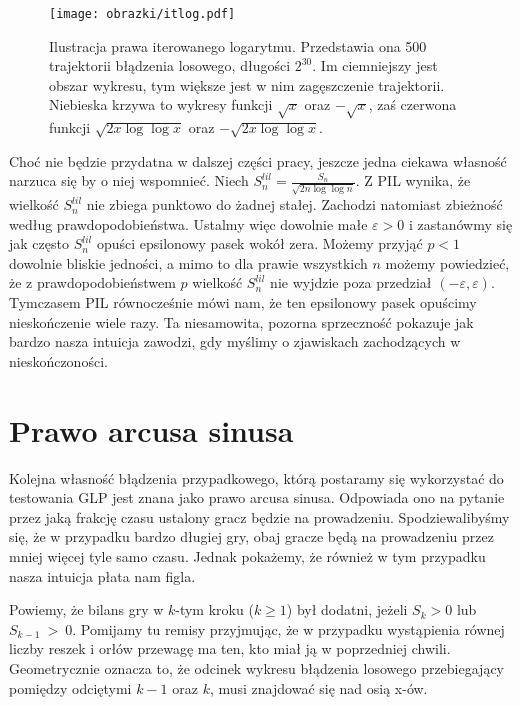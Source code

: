 \documentclass[a4paper,11pt,twoside]{book}
\newcommand{\Slil}[1]{S^{lil}_#1}
\theoremstyle{definition}
\begin{document}
\begin{figure}[!ht]
 \centering
 \texttt{[image: obrazki/itlog.pdf]}
 \caption{Ilustracja prawa iterowanego logarytmu. Przedstawia ona 500 trajektorii błądzenia losowego, długości $2^{30}$. Im ciemniejszy jest obszar wykresu, tym większe jest w nim zagęszczenie trajektorii. Niebieska krzywa to wykresy funkcji $\sqrt{x}$ oraz $-\sqrt{x}$, zaś czerwona funkcji $\sqrt{2 x \log \log x}$ oraz $-\sqrt{2 x \log \log x}$.}
 \label{fig:itlog}
\end{figure}

Choć nie będzie przydatna w dalszej części pracy, jeszcze jedna ciekawa własność narzuca się by o niej wspomnieć. Niech $\Slil{n} = \frac{S_n}{\sqrt{2n \log \log n}}$. Z PIL wynika, że wielkość $\Slil{n}$ nie zbiega punktowo do żadnej stałej. Zachodzi natomiast zbieżność według prawdopodobieństwa. Ustalmy więc dowolnie małe $\varepsilon > 0$ i zastanówmy się jak często $\Slil{n}$ opuści epsilonowy pasek wokół zera. Możemy przyjąć $p < 1$ dowolnie bliskie jedności, a mimo to dla prawie wszystkich $n$ możemy powiedzieć, że z prawdopodobieństwem $p$ wielkość $\Slil{n}$ nie wyjdzie poza przedział $(-\varepsilon, \varepsilon)$. Tymczasem PIL równocześnie mówi nam, że ten epsilonowy pasek opuścimy nieskończenie wiele razy. Ta niesamowita, pozorna sprzeczność pokazuje jak bardzo nasza intuicja zawodzi, gdy myślimy o zjawiskach zachodzących w nieskończoności.

\section{Prawo arcusa sinusa}
\label{par:asin}

Kolejna własność błądzenia przypadkowego, którą postaramy się wykorzystać do testowania GLP jest znana jako prawo arcusa sinusa. Odpowiada ono na pytanie przez jaką frakcję czasu ustalony gracz będzie na prowadzeniu. Spodziewalibyśmy się, że w przypadku bardzo długiej gry, obaj gracze będą na prowadzeniu przez mniej więcej tyle samo czasu. Jednak pokażemy, że również w tym przypadku nasza intuicja płata nam figla.

Powiemy, że bilans gry w $k$-tym kroku ($k \geq 1$) był dodatni, jeżeli $S_k > 0$ lub $S_{k-1}~>~0$. Pomijamy tu remisy przyjmując, że w przypadku wystąpienia równej liczby reszek i orłów przewagę ma ten, kto miał ją w poprzedniej chwili. Geometrycznie oznacza to, że odcinek wykresu błądzenia losowego przebiegający pomiędzy odciętymi $k-1$ oraz $k$, musi znajdować się nad osią x-ów.
\end{document}
